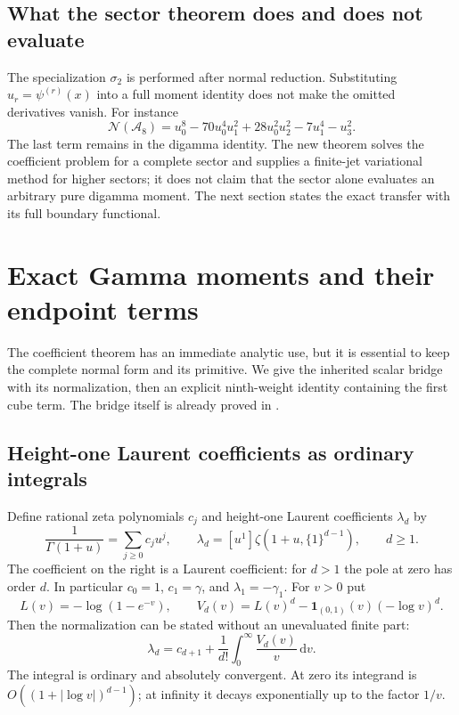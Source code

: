 \documentclass[11pt,letterpaper]{article}
\numberwithin{equation}{section}
\theoremstyle{plain}
\theoremstyle{definition}
\theoremstyle{remark}
\newcommand{\dd}{\,\mathrm d}\newcommand{\iu}{\mathrm i}
\newcommand{\NN}{\mathcal N}\newcommand{\HH}{\mathcal H}
\newcommand{\Acal}{\mathcal A}\newcommand{\cA}{\mathcal A}
\begin{document}
\subsection{What the sector theorem does and does not evaluate}

The specialization $\sigma_2$ is performed after normal reduction.
Substituting $u_r=\psi^{(r)}(x)$ into a full moment identity does not
make the omitted derivatives vanish. For instance
\[
 \NN(\Acal_8)
 =u_0^8-70u_0^4u_1^2+28u_0^2u_2^2-7u_1^4-u_3^2.
\]
The last term remains in the digamma identity. The new theorem solves
the coefficient problem for a complete sector and supplies a
finite-jet variational method for higher sectors; it does not claim
that the sector alone evaluates an arbitrary pure digamma moment.
The next section states the exact transfer with its full boundary
functional.


\section{Exact Gamma moments and their endpoint terms}
\label{mom:section}

The coefficient theorem has an immediate analytic use, but it is
essential to keep the complete normal form and its primitive.
We give the inherited scalar bridge with its normalization, then an
explicit ninth-weight identity containing the first cube term.
The bridge itself is already proved in \cite[Section 4]{PTI}.

\subsection{Height-one Laurent coefficients as ordinary integrals}

Define rational zeta polynomials $c_j$ and height-one Laurent
coefficients $\lambda_d$ by
\begin{equation}\label{mom:clambda}
 \frac1{\Gamma(1+u)}=\sum_{j\ge0}c_ju^j,\qquad
 \lambda_d=[u^1]\zeta(1+u,\{1\}^{d-1}),\qquad d\ge1.
\end{equation}
The coefficient on the right is a Laurent coefficient: for $d>1$
the pole at zero has order $d$. In particular
$c_0=1$, $c_1=\gamma$, and $\lambda_1=-\gamma_1$.
For $v>0$ put
\[
 L(v)=-\log(1-e^{-v}),\qquad
 V_d(v)=L(v)^d-\boldsymbol1_{(0,1)}(v)(-\log v)^d.
\]
Then the normalization can be stated without an unevaluated finite
part:
\begin{equation}\label{mom:lambdaintegral}
 \boxed{\displaystyle
 \lambda_d=c_{d+1}+\frac1{d!}
                    \int_0^\infty\frac{V_d(v)}v\dd v.}
\end{equation}
The integral is ordinary and absolutely convergent. At zero its
integrand is $O((1+|\log v|)^{d-1})$; at infinity it decays
exponentially up to the factor $1/v$.
\end{document}
